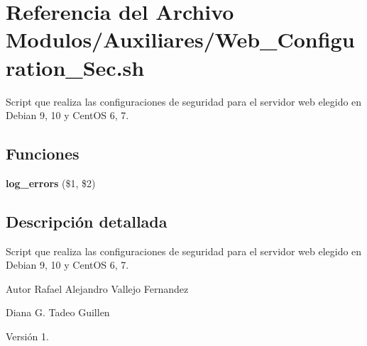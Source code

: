 \hypertarget{Web__Configuration__Sec_8sh}{}\section{Referencia del Archivo Modulos/\+Auxiliares/\+Web\+\_\+\+Configuration\+\_\+\+Sec.sh}
\label{Web__Configuration__Sec_8sh}


Script que realiza las configuraciones de seguridad para el servidor web elegido en Debian 9, 10 y Cent\+OS 6, 7.  


\subsection*{Funciones}
\begin{DoxyCompactItemize}
\item 
\mbox{\label{Web__Configuration__Sec_8sh_a92067b58a8478c9841b2cd9b75ea3565}} 
{\bfseries log\+\_\+errors} (\$1, \$2)
\end{DoxyCompactItemize}


\subsection{Descripción detallada}
Script que realiza las configuraciones de seguridad para el servidor web elegido en Debian 9, 10 y Cent\+OS 6, 7. 

\begin{DoxyAuthor}{Autor}
Rafael Alejandro Vallejo Fernandez 

Diana G. Tadeo Guillen 
\end{DoxyAuthor}
\begin{DoxyVersion}{Versión}
1. 
\end{DoxyVersion}
